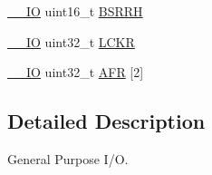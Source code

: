 \begin{DoxyCompactItemize}
\item 
\hyperlink{group___c_m_s_i_s__core__definitions_gaec43007d9998a0a0e01faede4133d6be}{\-\_\-\-\_\-\-I\-O} uint16\-\_\-t \hyperlink{struct_g_p_i_o___type_def_a35f89f65edca7ed58738166424aeef48}{B\-S\-R\-R\-H}
\item 
\hyperlink{group___c_m_s_i_s__core__definitions_gaec43007d9998a0a0e01faede4133d6be}{\-\_\-\-\_\-\-I\-O} uint32\-\_\-t \hyperlink{struct_g_p_i_o___type_def_a2612a0f4b3fbdbb6293f6dc70105e190}{L\-C\-K\-R}
\item 
\hyperlink{group___c_m_s_i_s__core__definitions_gaec43007d9998a0a0e01faede4133d6be}{\-\_\-\-\_\-\-I\-O} uint32\-\_\-t \hyperlink{struct_g_p_i_o___type_def_ab67c1158c04450d19ad483dcd2192e43}{A\-F\-R} \mbox{[}2\mbox{]}
\end{DoxyCompactItemize}


\subsection{Detailed Description}
General Purpose I/\-O. 

